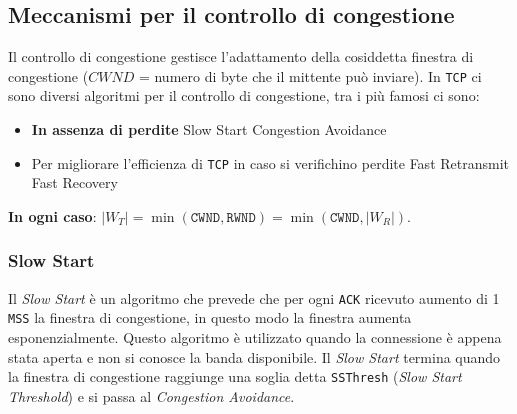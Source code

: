     \subsection{Meccanismi per il controllo di congestione}
        Il controllo di congestione gestisce l'adattamento della cosiddetta finestra di congestione ($CWND$ = numero di byte che il mittente può inviare). \newline
        In \texttt{TCP} ci sono diversi algoritmi per il controllo di congestione, tra i più famosi ci sono: \begin{itemize}
            \item \textbf{In assenza di perdite}
                \subitem Slow Start
                \subitem Congestion Avoidance
            \item Per migliorare l'efficienza di \texttt{TCP} in caso si verifichino perdite
                \subitem Fast Retransmit
                \subitem Fast Recovery
        \end{itemize}
        \textbf{In ogni caso}: $ |W_T| = \min(\texttt{CWND}, \texttt{RWND}) = \min(\texttt{CWND}, |W_R|) $.
        \subsubsection{Slow Start}
            Il \textit{Slow Start} è un algoritmo che prevede che per ogni \texttt{ACK} ricevuto aumento di 1 \texttt{MSS} la finestra di congestione, in questo modo la finestra aumenta esponenzialmente. Questo algoritmo è utilizzato quando la connessione è appena stata aperta e non si conosce la banda disponibile. Il \textit{Slow Start} termina quando la finestra di congestione raggiunge una soglia detta \texttt{SSThresh} (\textit{Slow Start Threshold}) e si passa al \textit{Congestion Avoidance}.
